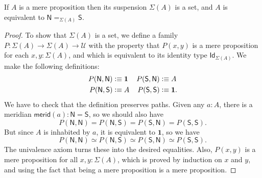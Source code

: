 \documentclass[10pt,a4paper]{article}
\newcommand{\defeq}{\vcentcolon\equiv}  %
\newcommand{\id}[3][]{\ensuremath{#2 =_{#1} #3}\xspace}
\newcommand{\idtypevar}[1]{\ensuremath{\mathsf{Id}_{#1}}\xspace}
\newcommand{\eqvsym}{\simeq}    %
\newcommand{\UU}{\ensuremath{\mathcal{U}}\xspace}
\let\type\UU
\newcommand{\unit}{\ensuremath{\mathbf{1}}\xspace}
\newcommand{\susp}{\Sigma}
\newcommand{\north}{\mathsf{N}}
\newcommand{\south}{\mathsf{S}}
\newcommand{\merid}{\mathsf{merid}}
\theoremstyle{definition}
\theoremstyle{remark}
\numberwithin{equation}{section}
\begin{document}
\begin{lem}\label{prop:trunc_of_prop_is_set}
If $A$ is a mere proposition then its suspension $\susp(A)$ is a set,
and $A$ is equivalent to $\id[\susp(A)]{\north}{\south}$.
\end{lem}

\begin{proof}
To show that $\susp(A)$ is a set, we define a
family $P:\susp(A)\to\susp(A)\to\type$ with the
property that $P(x,y)$ is a mere proposition for each $x,y:\susp(A)$,
and which is equivalent to its identity type $\idtypevar{\susp(A)}$.
%
We make the following definitions:
\begin{align*}
P(\north,\north) & \defeq \unit &
P(\south,\north) & \defeq A\\
P(\north,\south) & \defeq A &
P(\south,\south) & \defeq \unit.
\end{align*}
We have to check that the definition preserves paths.
Given any $a : A$, there is a meridian $\merid(a) : \north = \south$,
so we should also have
%
\begin{equation*}
  P(\north, \north) = P(\north, \south) = P(\south, \north) = P(\south, \south).
\end{equation*}
%
But since $A$ is inhabited by $a$, it is equivalent to $\unit$, so we have
%
\begin{equation*}
  P(\north, \north) \eqvsym P(\north, \south) \eqvsym P(\south, \north) \eqvsym P(\south, \south).
\end{equation*}
%
The univalence axiom turns these into the desired equalities. Also, $P(x,y)$ is a mere
proposition for all $x, y : \susp(A)$, which is proved by induction on $x$ and $y$, and
using the fact that being a mere proposition is a mere proposition.


\end{proof}
\end{document}
